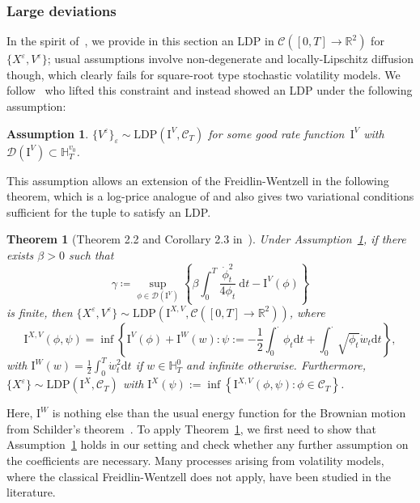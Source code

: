 \documentclass{amsart}[11pt]
\numberwithin{equation}{section}
\newtheorem{theorem}{Theorem}%
\numberwithin{theorem}{subsection}
\numberwithin{proposition}{subsection}
\numberwithin{definition}{subsection}
\numberwithin{lemma}{subsection}
\newtheorem{assumption}{Assumption}
\numberwithin{assumption}{subsection}
\newcommand{\Cc}{\mathcal{C}}
\newcommand{\Dd}{\mathcal{D}}
\newcommand{\HH}{\mathbb{H}}
\newcommand{\RR}{\mathbb{R}}
\newcommand{\D}{\mathrm{d}}
\newcommand{\IIV}{\mathrm{I}^{V}}
\newcommand{\IIW}{\mathrm{I}^{W}}
\newcommand{\IIX}{\mathrm{I}^{X}}
\newcommand{\IIXV}{\mathrm{I}^{X,V}}
\newcommand{\LDP}{\mathrm{LDP}}
\newcommand{\eps}{\varepsilon}
\begin{document}
\subsubsection{Large deviations}
In the spirit of~\cite{Freidlin2012}, 
we provide in this section an LDP in ${\Cc([0,T]\to\RR^2)}$ for $\{X^\eps, V^\eps\}$;
usual assumptions involve non-degenerate and locally-Lipschitz diffusion though, 
which clearly fails for square-root type stochastic volatility models. 
We follow~\cite{Robertson2010} who lifted this constraint and instead showed an LDP under the following assumption:
\begin{assumption}\label{ass:LDP_robertson}
$\{V^{\eps}\}_{\eps}\sim\LDP(\IIV, \Cc_T)$
for some good rate function~$\IIV$ 
with $\Dd(\IIV)\subset \HH_{T}^{v_0}$.
\end{assumption}
This assumption allows an extension of the Freidlin-Wentzell in the following theorem, which is a log-price analogue of \cite[Theorem 2.2]{Robertson2010} and also gives two variational conditions sufficient for the tuple to satisfy an LDP.
\begin{theorem}[Theorem 2.2 and Corollary 2.3 in~\cite{Robertson2010}]\label{thm:robertsonLDP}
Under Assumption~\ref{ass:LDP_robertson}, 
if there exists $\beta>0$ such that
\begin{equation}\label{eq:robertsonLDPcond}
\gamma \coloneqq \sup_{\phi \in \Dd(\IIV)}\left\{\beta \int_{0}^{T} \frac{\dot{\phi}_{t}^{2}}{4\phi_{t}}  \mathrm{~d} t - \IIV(\phi)\right\}
\end{equation}
is finite, then 
$\{X^{\eps}, V^{\eps}\}\sim\LDP\left(\IIXV,\Cc\left([0,T]\to\RR^2\right)\right)$, where
$$
\IIXV(\phi, \psi)=\inf \left\{\IIV(\phi) + \IIW(w): \psi :=-\frac12\int_{0}^{\cdot}\phi_t\D t+\int_{0}^{\cdot} \sqrt{\phi_{t}} \dot{w}_{t} \D t\right\},
$$
with
$\IIW(w) = \frac{1}{2} \int_{0}^{T} \dot{w}_{t}^{2} \D t$
if $w \in \HH_{T}^{0}$ and infinite otherwise.
Furthermore, $\{X^{\eps}\}\sim\LDP(\IIX, \Cc_T)$ with
$\IIX(\psi):=\inf \left\{\IIXV(\phi, \psi): \phi \in \Cc_T\right\}$.
\end{theorem}
Here, $\IIW$ is nothing else than the usual energy function for the Brownian motion from Schilder's theorem~\cite{Schilder1966}.
To apply Theorem~\ref{thm:robertsonLDP}, we first need to show that Assumption~\ref{ass:LDP_robertson} holds in our setting and check whether any further assumption on the coefficients are necessary. 
Many processes arising from volatility models, where the classical Freidlin-Wentzell does not apply, have been studied in the literature. 
\end{document}
